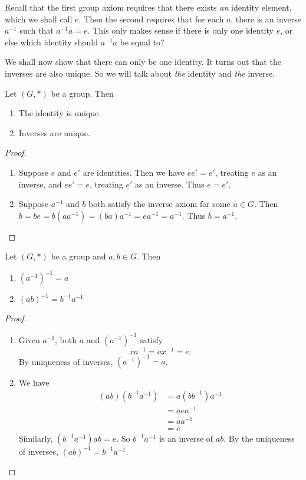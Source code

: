 \documentclass[a4paper]{article}
\begin{document}
Recall that the first group axiom requires that there exists \emph{an} identity element, which we shall call $e$. Then the second requires that for each $a$, there is an inverse $a^{-1}$ such that $a^{-1}a = e$. This only makes sense if there is only one identity $e$, or else which identity should $a^{-1}a$ be equal to?

We shall now show that there can only be one identity. It turns out that the inverses are also unique. So we will talk about \emph{the} identity and \emph{the} inverse.
\begin{prop}
  Let $(G, *)$ be a group. Then
  \begin{enumerate}
    \item The identity is unique.
    \item Inverses are unique.
  \end{enumerate}
\end{prop}
\begin{proof}\leavevmode
  \begin{enumerate}[label=(\roman{*})]
    \item Suppose $e$ and $e'$ are identities. Then we have $ee' = e'$, treating $e$ as an inverse, and $ee' = e$, treating $e'$ as an inverse. Thus $e = e'$.
    \item Suppose $a^{-1}$ and $b$ both satisfy the inverse axiom for some $a\in G$. Then $b = be = b(aa^{-1}) = (ba)a^{-1} = ea^{-1} = a^{-1}$. Thus $b = a^{-1}$.
  \end{enumerate}
\end{proof}
\begin{prop}
  Let $(G, *)$ be a group and $a, b\in G$. Then
  \begin{enumerate}
    \item $(a^{-1})^{-1} = a$
    \item $(ab)^{-1} = b^{-1}a^{-1}$
  \end{enumerate}
\end{prop}
\begin{proof}\leavevmode
  \begin{enumerate}
    \item Given $a^{-1}$, both $a$ and $(a^{-1})^{-1}$ satisfy
      \[
        xa^{-1} = ax^{-1} = e.
      \]
      By uniqueness of inverses, $(a^{-1})^{-1} = a$.
    \item We have
      \begin{align*}
        (ab)(b^{-1}a^{-1}) &= a(bb^{-1})a^{-1} \\
        &= aea^{-1}\\
        &= aa^{-1}\\
        &= e
      \end{align*}
      Similarly, $(b^{-1}a^{-1})ab = e$. So $b^{-1}a^{-1}$ is an inverse of $ab$. By the uniqueness of inverses, $(ab)^{-1} = b^{-1}a^{-1}$.
  \end{enumerate}
\end{proof}
\end{document}
